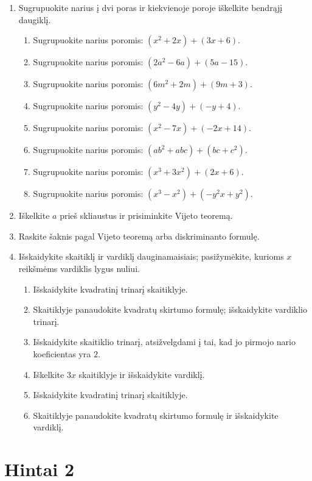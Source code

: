 \documentclass[11pt,a4paper]{scrartcl}
\begin{document}
\begin{enumerate}[label=\textbf{\arabic*.}, leftmargin=*]
\begin{enumerate}[label={(\arabic*)}]
    \end{enumerate}
    \item Sugrupuokite narius į dvi poras ir kiekvienoje poroje iškelkite bendrąjį daugiklį.
    \begin{enumerate}[label={(\arabic*)}]
        \item Sugrupuokite narius poromis: $(x^2+2x)+(3x+6)$.
        \item Sugrupuokite narius poromis: $(2a^2-6a)+(5a-15)$.
        \item Sugrupuokite narius poromis: $(6m^2+2m)+(9m+3)$.
        \item Sugrupuokite narius poromis: $(y^2-4y)+(-y+4)$.
        \item Sugrupuokite narius poromis: $(x^2-7x)+(-2x+14)$.
        \item Sugrupuokite narius poromis: $(ab^2+abc)+(bc+c^2)$.
        \item Sugrupuokite narius poromis: $(x^3+3x^2)+(2x+6)$.
        \item Sugrupuokite narius poromis: $(x^3-x^2)+(-y^2x+y^2)$.
    \end{enumerate}
    \item Iškelkite $a$ prieš skliaustus ir prisiminkite Vijeto teoremą.
    \item Raskite šaknis pagal Vijeto teoremą arba diskriminanto formulę.

    \item Išskaidykite skaitiklį ir vardiklį dauginamaisiais; pasižymėkite, kurioms $x$ reikšmėms vardiklis lygus nuliui.
    \begin{enumerate}[label={(\arabic*)}]
        \item Išskaidykite kvadratinį trinarį skaitiklyje.
        \item Skaitiklyje panaudokite kvadratų skirtumo formulę; išskaidykite vardiklio trinarį.
        \item Išskaidykite skaitiklio trinarį, atsižvelgdami į tai, kad jo pirmojo nario koeficientas yra $2$.
        \item Iškelkite $3x$ skaitiklyje ir išskaidykite vardiklį.
        \item Išskaidykite kvadratinį trinarį skaitiklyje.
        \item Skaitiklyje panaudokite kvadratų skirtumo formulę ir išskaidykite vardiklį.
    \end{enumerate}
\end{enumerate}

\newpage
\section{Hintai 2}
\end{document}
